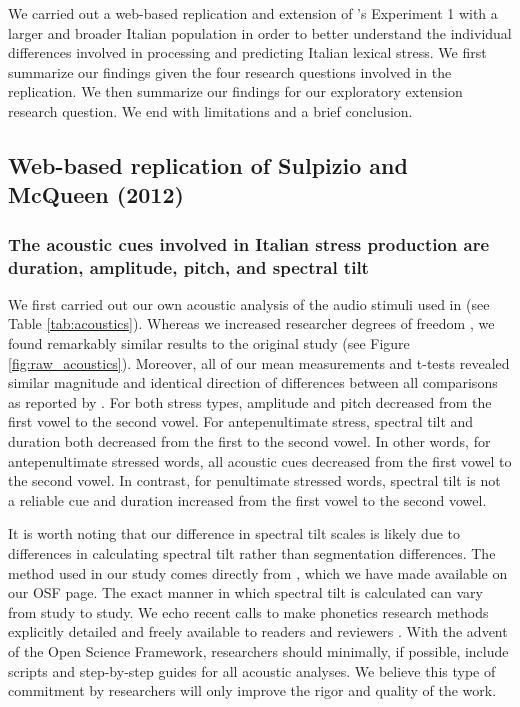 We carried out a web-based replication and extension of \cite{Sulpizio_McQueen_2012}'s Experiment 1 with a larger and broader Italian population in order to better understand the individual differences involved in processing and predicting Italian lexical stress. We first summarize our findings given the four research questions involved in the replication. We then summarize our findings for our exploratory extension research question. We end with limitations and a brief conclusion.

\subsection{Web-based replication of Sulpizio and McQueen (2012)}
\subsubsection{The acoustic cues involved in Italian stress production are duration, amplitude, pitch, and spectral tilt}
We first carried out our own acoustic analysis of the audio stimuli used in \cite{Sulpizio_McQueen_2012} (see Table \ref{tab:acoustics}). Whereas we increased researcher degrees of freedom \citep{Corretta2023, roettger2019researcher}, we found remarkably similar results to the original study (see Figure \ref{fig:raw_acoustics}). Moreover, all of our mean measurements and t-tests revealed similar magnitude and identical direction of differences between all comparisons as reported by \cite{Sulpizio_McQueen_2012}. For both stress types, amplitude and pitch decreased from the first vowel to the second vowel. For antepenultimate stress, spectral tilt and duration both decreased from the first to the second vowel. In other words, for antepenultimate stressed words, all acoustic cues decreased from the first vowel to the second vowel. In contrast, for penultimate stressed words, spectral tilt is not a reliable cue and duration increased from the first vowel to the second vowel.

It is worth noting that our difference in spectral tilt scales is likely due to differences in calculating spectral tilt rather than segmentation differences. The method used in our study comes directly from \citep{sluijter1996spectral,cutler2007dutch}, which we have made available on our OSF page. The exact manner in which spectral tilt is calculated can vary from study to study. We echo recent calls to make phonetics research methods explicitly detailed and freely available to readers and reviewers \citep{roettger2019emergent, roettger2019researcher}. With the advent of the Open Science Framework, researchers should minimally, if possible, include scripts and step-by-step guides for all acoustic analyses. We believe this type of commitment by researchers will only improve the rigor and quality of the work.

